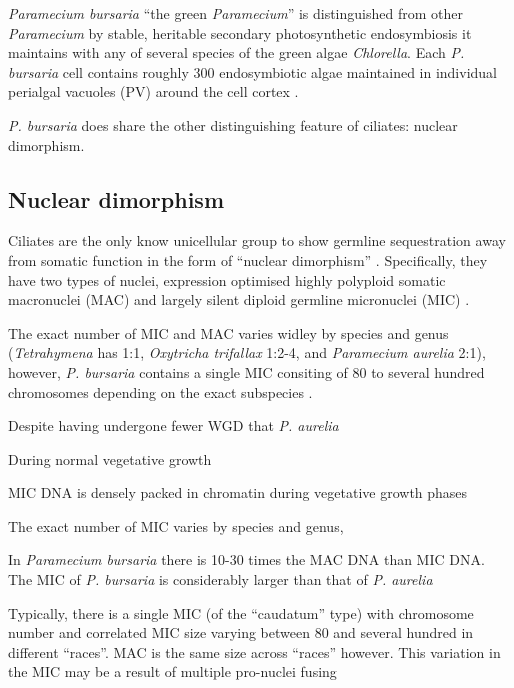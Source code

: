 \textit{Paramecium bursaria} ``the green \textit{Paramecium}'' is distinguished from other \textit{Paramecium} by stable, heritable
secondary photosynthetic endosymbiosis it maintains with any of several species of the green algae \textit{Chlorella}.
Each \textit{P. bursaria} cell contains roughly 300 endosymbiotic algae maintained in individual perialgal vacuoles (PV) around the cell
cortex \citep{Hoshina2009}.

\textit{P. bursaria} does share the other distinguishing feature of ciliates: nuclear dimorphism.

\subsection{Nuclear dimorphism}

Ciliates are the only know unicellular group to show germline sequestration away from somatic function in the form of ``nuclear dimorphism'' \citep{Jahn2002}.
Specifically, they have two types of nuclei, expression optimised highly polyploid somatic macronuclei (MAC)
and largely silent diploid germline micronuclei (MIC) \citep{Prescott1994}. 

The exact number of MIC and MAC varies widley by species and genus (\textit{Tetrahymena} has 1:1, 
\textit{Oxytricha trifallax} 1:2-4, and \textit{Paramecium aurelia} 2:1), however, \textit{P. bursaria}
contains a single MIC consiting of 80 to several hundred chromosomes depending
on the exact subspecies \citep{Chen1940}. 

Despite having undergone fewer WGD that \textit{P. aurelia} 

During normal vegetative growth






  


MIC DNA is densely packed in chromatin during vegetative growth phases 

The exact number of MIC
varies by species and genus, 

In \textit{Paramecium bursaria} there is 10-30 times the MAC DNA than MIC DNA.  The MIC of \textit{P. bursaria} is 
considerably larger than that of \textit{P. aurelia} \citep{Cullis1972}

Typically, there is a single MIC (of the ``caudatum'' type) with chromosome number and correlated MIC size
varying between 80 and several hundred in different ``races''.  MAC is the same size across ``races'' however.
This variation in the MIC may be a result of multiple pro-nuclei fusing \citep{Chen1940}



